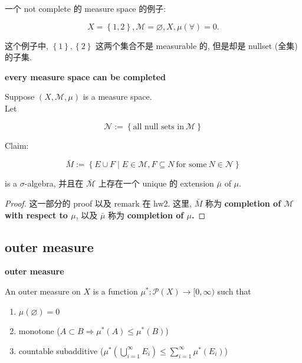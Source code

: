 \documentclass{qlnotes-export}
\begin{document}
\begin{example}

一个 not complete 的 measure space 的例子:

\[X = \left\{ {1,2} \right\},\mathcal{M} = \varnothing,X,\mu(\forall) = 0.\]

这个例子中, \(\left\{ 1 \right\},\left\{ 2 \right\}\) 这两个集合不是 measurable 的, 但是却是 nullset (全集) 的子集.

\end{example}

\begin{theorem}{\protect{}\label{kn-every-measure-space-can-be-completed}{\textbf{every
measure space can be completed}}}

Suppose \((X,\mathcal{M},\mu)\) is a measure space.\\
Let

\[\mathcal{N} := \left\{ {\text{all null sets in}\ \mathcal{M}} \right\}\]

Claim:

\[\bar{M} := \left\{ {E \cup F \mid E \in \mathcal{M},F \subseteq N\ \text{for some}\ N \in \mathcal{N}} \right\}\]

is a \(\sigma\)-algebra, 并且在 \(\bar{\mathcal{M}}\) 上存在一个 unique 的 extension \(\bar{\mu}\) of \(\mu\).

\end{theorem}

\begin{proof}

这一部分的 proof 以及 remark 在 hw2. 这里, \(\bar{M}\) 称为 \textbf{completion of \(\mathcal{M}\) with respect to \(\mu\)}, 以及 \(\bar{\mu}\) 称为 \textbf{completion of \(\mu\).}

\end{proof}

\subsection{outer measure}\label{outer-measure}

\begin{definition}{\protect{}\label{kn-outer-measure}{\textbf{outer measure}}}

An outer measure on \(X\) is a function \(\mu^{\ast}:\mathcal{P}(X)\rightarrow\lbrack 0,\infty)\) such that

\begin{enumerate}
\item
  \(\mu(\varnothing) = 0\)
\item
  monotone (\(A \subset B\Longrightarrow\mu^{\ast}(A) \leq \mu^{\ast}(B)\))
\item
  countable subadditive (\(\mu^{\ast}(\bigcup_{i = 1}^{\infty}E_{i}) \leq \sum_{i = 1}^{\infty}\mu^{\ast}(E_{i})\))
\end{enumerate}

\end{definition}
\end{document}
